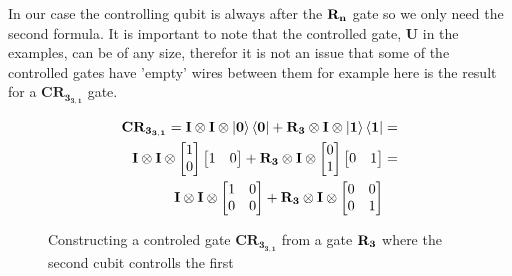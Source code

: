 In our case the controlling qubit is always after the $\mathbf{R_{n}}$ gate so we only need the second formula. 
It is important to note that the controlled gate, $\mathbf{U}$ in the examples, can be of any size, therefor it is not an issue that some of the controlled gates have 'empty' wires between them for example here is the result for a $\mathbf{CR_{3_{3,1}}}$ gate. 
\begin{figure}[H]
    \begin{align*}
        \mathbf{CR_{3_{3,1}}}=\mathbf{I}\otimes\mathbf{I}\otimes\ket{\mathbf{0}}\bra{\mathbf{0}} + \mathbf{R_{3}}\otimes\mathbf{I}\otimes\ket{\mathbf{1}}\bra{\mathbf{1}}&=\\
        \mathbf{I}\otimes\mathbf{I}\otimes
        \begin{bmatrix}
            1 \\
            0 \\
        \end{bmatrix}
        \begin{bmatrix}
            1 & 0 \\
        \end{bmatrix}+
        \mathbf{R_{3}}\otimes\mathbf{I}\otimes
        \begin{bmatrix}
            0 \\
            1 \\
        \end{bmatrix}
        \begin{bmatrix}
            0 & 1 \\
        \end{bmatrix}
        &=\\
        \mathbf{I}\otimes\mathbf{I}\otimes
        \begin{bmatrix}
            1 & 0 \\
            0 & 0 \\
        \end{bmatrix}+ 
        \mathbf{R_{3}}\otimes\mathbf{I}\otimes
        \begin{bmatrix}
            0 & 0 \\
            0 & 1 \\
        \end{bmatrix}& 
    \end{align*}
    \caption{Constructing a controled gate $\mathbf{CR_{3_{3,1}}}$ from a gate $\mathbf{R_{3}}$ where the second cubit controlls the first}
    \label{fig:CR3}
\end{figure}

